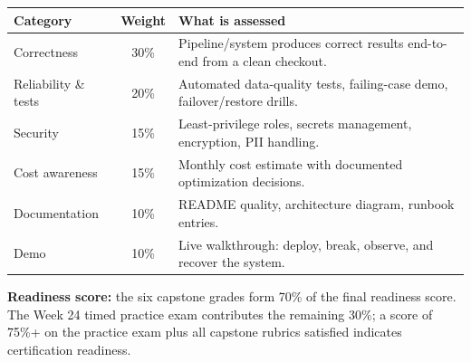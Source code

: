 \documentclass[11pt, a4paper]{article}
\begin{document}
\begin{center}
\renewcommand{\arraystretch}{1.3}
\begin{tabular}{@{} l c p{7.5cm} @{}}
\toprule
\textbf{Category} & \textbf{Weight} & \textbf{What is assessed} \\
\midrule
Correctness & 30\% & Pipeline/system produces correct results end-to-end from a clean checkout. \\
Reliability \& tests & 20\% & Automated data-quality tests, failing-case demo, failover/restore drills. \\
Security & 15\% & Least-privilege roles, secrets management, encryption, PII handling. \\
Cost awareness & 15\% & Monthly cost estimate with documented optimization decisions. \\
Documentation & 10\% & README quality, architecture diagram, runbook entries. \\
Demo & 10\% & Live walkthrough: deploy, break, observe, and recover the system. \\
\bottomrule
\end{tabular}
\end{center}

\textbf{Readiness score:} the six capstone grades form 70\% of the final readiness score. The Week 24 timed practice exam contributes the remaining 30\%; a score of 75\%+ on the practice exam plus all capstone rubrics satisfied indicates certification readiness.
\end{document}
